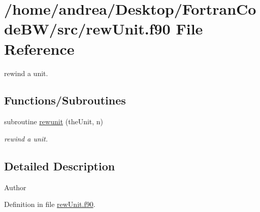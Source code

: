 \hypertarget{rew_unit_8f90}{\section{/home/andrea/\-Desktop/\-Fortran\-Code\-B\-W/src/rew\-Unit.f90 File Reference}
\label{rew_unit_8f90}
}


rewind a unit.  


\subsection*{Functions/\-Subroutines}
\begin{DoxyCompactItemize}
\item 
subroutine \hyperlink{rew_unit_8f90_ad71be38edfc5b3981be9de4cd607daa6}{rewunit} (the\-Unit, n)
\begin{DoxyCompactList}\small\item\em rewind a unit. \end{DoxyCompactList}\end{DoxyCompactItemize}


\subsection{Detailed Description}
\begin{DoxyAuthor}{Author}

\end{DoxyAuthor}


Definition in file \hyperlink{rew_unit_8f90_source}{rew\-Unit.\-f90}.



